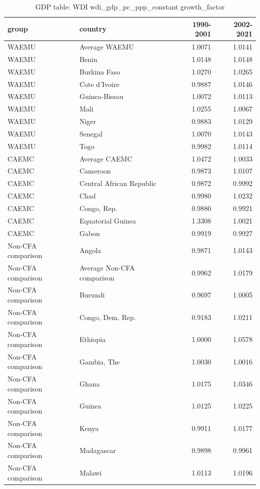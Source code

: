 \begin{table}

\caption{GDP table: WDI wdi_gdp_pc_ppp_constant growth_factor}
\centering
\begin{tabular}[t]{llrr}
\toprule
group & country & 1990-2001 & 2002-2021\\
\midrule
WAEMU & Average WAEMU & 1.0071 & 1.0141\\
WAEMU & Benin & 1.0148 & 1.0148\\
WAEMU & Burkina Faso & 1.0270 & 1.0265\\
WAEMU & Cote d'Ivoire & 0.9887 & 1.0146\\
WAEMU & Guinea-Bissau & 1.0072 & 1.0113\\
\addlinespace
WAEMU & Mali & 1.0255 & 1.0067\\
WAEMU & Niger & 0.9883 & 1.0129\\
WAEMU & Senegal & 1.0070 & 1.0143\\
WAEMU & Togo & 0.9982 & 1.0114\\
CAEMC & Average CAEMC & 1.0472 & 1.0033\\
\addlinespace
CAEMC & Cameroon & 0.9873 & 1.0107\\
CAEMC & Central African Republic & 0.9872 & 0.9992\\
CAEMC & Chad & 0.9980 & 1.0232\\
CAEMC & Congo, Rep. & 0.9880 & 0.9921\\
CAEMC & Equatorial Guinea & 1.3308 & 1.0021\\
\addlinespace
CAEMC & Gabon & 0.9919 & 0.9927\\
Non-CFA comparison & Angola & 0.9871 & 1.0143\\
Non-CFA comparison & Average Non-CFA comparison & 0.9962 & 1.0179\\
Non-CFA comparison & Burundi & 0.9697 & 1.0005\\
Non-CFA comparison & Congo, Dem. Rep. & 0.9183 & 1.0211\\
\addlinespace
Non-CFA comparison & Ethiopia & 1.0000 & 1.0578\\
Non-CFA comparison & Gambia, The & 1.0030 & 1.0016\\
Non-CFA comparison & Ghana & 1.0175 & 1.0346\\
Non-CFA comparison & Guinea & 1.0125 & 1.0225\\
Non-CFA comparison & Kenya & 0.9911 & 1.0177\\
\addlinespace
Non-CFA comparison & Madagascar & 0.9898 & 0.9961\\
Non-CFA comparison & Malawi & 1.0113 & 1.0196\\

\end{tabular}
\end{table}
